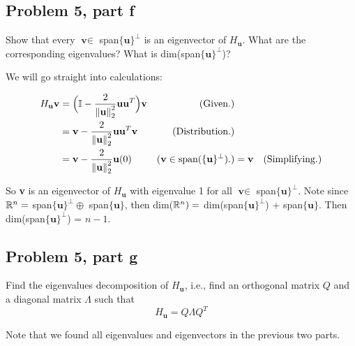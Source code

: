 \newpage
\subsection{Problem 5, part f}
Show that every $\textbf{v} \in $ span$\{ \textbf{u}\}^\perp$ is an eigenvector of $H_\textbf{u}$. What are the corresponding eigenvalues? What is dim(span$\{\textbf{u}\}^\perp$)?
\partbreak
\begin{solution}

    We will go straight into calculations:

    \alignbreak
    \begin{align*}
        H_\textbf{u}\textbf{v} &= \Big( \mathbb{I} - \frac{2}{\norm{\textbf{u}}_2^2} \textbf{u}\textbf{u}^T\Big)\textbf{v} &\text{(Given.)}\\
        &= \textbf{v} - \frac{2}{\norm{\textbf{u}}_2^2} \textbf{u}\textbf{u}^T\textbf{v} &\text{(Distribution.)}\\
        &= \textbf{v} - \frac{2}{\norm{\textbf{u}}_2^2} \textbf{u}(0) &(\textbf{v} \in \text{span} (\{ \textbf{u}\}^\perp).)
        &= \textbf{v} &\text{(Simplifying.)}
    \end{align*}
    \alignbreak

    So \textbf{v} is an eigenvector of $H_\textbf{u}$ with eigenvalue 1 for all $\textbf{v} \in $ span$\{ \textbf{u}\}^\perp$. Note since $\mathbb{R}^n =$ span$\{ \textbf{u}\}^\perp \oplus $ span$\{ \textbf{u}\}$, then dim($\mathbb{R}^n) =$ dim(span$\{ \textbf{u}\}^\perp$) + span$\{ \textbf{u}\}$. Then dim(span$\{ \textbf{u}\}^\perp$) = $n - 1$.
\end{solution}

\newpage
\subsection{Problem 5, part g}
Find the eigenvalues decomposition of $H_\textbf{u}$, i.e., find an orthogonal matrix $Q$ and a diagonal matrix $\Lambda$ such that 
\[
H_\textbf{u} = Q\Lambda Q^T
\]
\partbreak
\begin{solution}

    Note that we found all eigenvalues and eigenvectors in the previous two parts. 
\end{solution}
